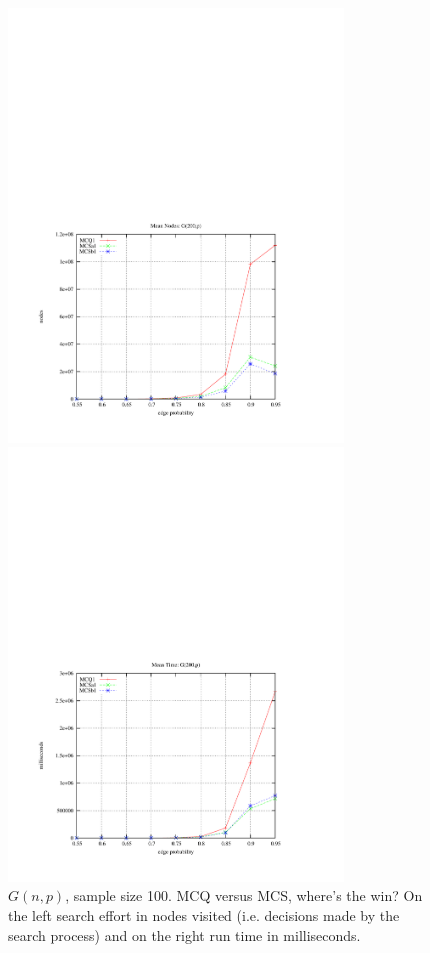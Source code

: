 \documentclass{l4proj}
\begin{document}
\begin{figure}
\begin{center}
\begin{minipage}[t]{0.49\textwidth}
\end{minipage}
\end{center}
\vspace{-6cm}
\begin{center}
\hspace{-1.5cm}
\begin{minipage}[t]{0.49\textwidth}
\includegraphics[height=11.5cm]{nds-200.pdf}
\end{minipage}
\hfill
\begin{minipage}[t]{0.49\textwidth}
\includegraphics[height=11.5cm]{time-200.pdf}
\end{minipage}
\end{center}
\caption{$G(n,p)$, sample size 100.
MCQ versus MCS, where's the win? On the left search effort in nodes visited (i.e. decisions made by the search 
process) and on the right run time in milliseconds.}
\label{mcqVmcs}
\end{figure}
\end{document}
